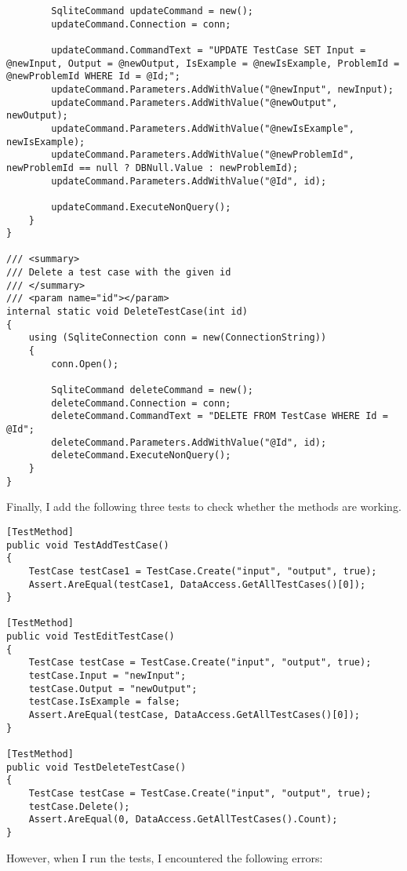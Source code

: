 \documentclass[report.tex]{subfiles}
\begin{document}
\begin{verbatim}
        SqliteCommand updateCommand = new();
        updateCommand.Connection = conn;

        updateCommand.CommandText = "UPDATE TestCase SET Input = @newInput, Output = @newOutput, IsExample = @newIsExample, ProblemId = @newProblemId WHERE Id = @Id;";
        updateCommand.Parameters.AddWithValue("@newInput", newInput);
        updateCommand.Parameters.AddWithValue("@newOutput", newOutput);
        updateCommand.Parameters.AddWithValue("@newIsExample", newIsExample);
        updateCommand.Parameters.AddWithValue("@newProblemId", newProblemId == null ? DBNull.Value : newProblemId);
        updateCommand.Parameters.AddWithValue("@Id", id);

        updateCommand.ExecuteNonQuery();
    }
}

/// <summary>
/// Delete a test case with the given id
/// </summary>
/// <param name="id"></param>
internal static void DeleteTestCase(int id)
{
    using (SqliteConnection conn = new(ConnectionString))
    {
        conn.Open();

        SqliteCommand deleteCommand = new();
        deleteCommand.Connection = conn;
        deleteCommand.CommandText = "DELETE FROM TestCase WHERE Id = @Id";
        deleteCommand.Parameters.AddWithValue("@Id", id);
        deleteCommand.ExecuteNonQuery();
    }
}
\end{verbatim}

Finally, I add the following three tests to check whether the methods are working.

\begin{verbatim}
[TestMethod]
public void TestAddTestCase()
{
    TestCase testCase1 = TestCase.Create("input", "output", true);
    Assert.AreEqual(testCase1, DataAccess.GetAllTestCases()[0]);
}

[TestMethod]
public void TestEditTestCase()
{
    TestCase testCase = TestCase.Create("input", "output", true);
    testCase.Input = "newInput";
    testCase.Output = "newOutput";
    testCase.IsExample = false;
    Assert.AreEqual(testCase, DataAccess.GetAllTestCases()[0]);
}

[TestMethod]
public void TestDeleteTestCase()
{
    TestCase testCase = TestCase.Create("input", "output", true);
    testCase.Delete();
    Assert.AreEqual(0, DataAccess.GetAllTestCases().Count);
}
\end{verbatim}

However, when I run the tests, I encountered the following errors:
\end{document}
